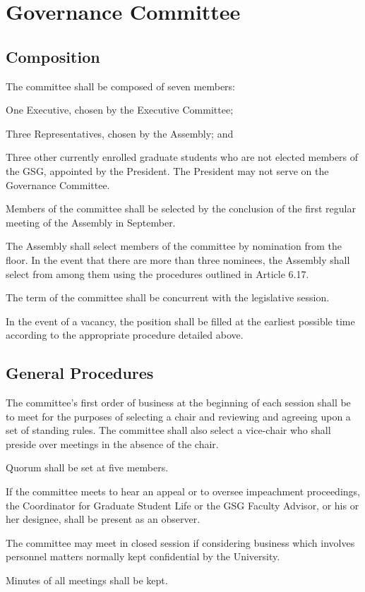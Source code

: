 \chapter{Governance Committee}

\section{Composition}
\begin{bylaws-number}
  \item The committee shall be composed of seven members:
  \begin{bylaws-number}
    \item One Executive, chosen by the Executive Committee;
    \item Three Representatives, chosen by the Assembly; and
    \item Three other currently enrolled graduate students who are not elected members of the GSG, appointed by the President.
The President may not serve on the Governance Committee.
  \end{bylaws-number}
  \item Members of the committee shall be selected by the conclusion of the first regular meeting of the Assembly in September.
  \item The Assembly shall select members of the committee by nomination from the floor. In the event that there are more than three nominees, the Assembly shall select from among them using the procedures outlined in Article 6.17.
  \item The term of the committee shall be concurrent with the legislative session.
  \item In the event of a vacancy, the position shall be filled at the earliest possible time according to the appropriate procedure detailed above.
\end{bylaws-number}

\section{General Procedures}
\begin{bylaws-number}
  \item The committee’s first order of business at the beginning of each session shall be to meet for the purposes of selecting a chair and reviewing and agreeing upon a set of standing rules. The committee shall also select a vice-chair who shall preside over meetings in the absence of the chair.
  \item Quorum shall be set at five members.
  \item If the committee meets to hear an appeal or to oversee impeachment proceedings, the Coordinator for Graduate Student Life or the GSG Faculty Advisor, or his or her designee, shall be present as an observer.
  \item The committee may meet in closed session if considering business which involves personnel matters normally kept confidential by the University.
  \item Minutes of all meetings shall be kept.
\end{bylaws-number}

